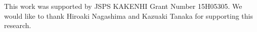 \documentclass[JIP]{ipsj_v2/UTF8/ipsj}
\begin{document}
\begin{acknowledgment}
This work was supported by JSPS KAKENHI Grant Number 15H05305.
We would like to thank Hiroaki Nagashima and Kazuaki Tanaka for supporting this research.
\end{acknowledgment}





\end{document}
